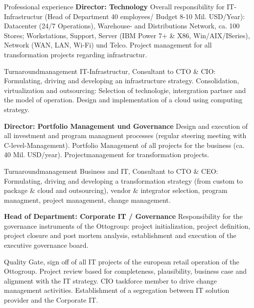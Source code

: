 \begin{rubric}{Professional experience}
\entry*[04/2013 - today] \textbf{Director: Technology}\newline
{} 
Overall responsibility for IT-Infrastructur (Head of Department 40 employees/ Budget 8-10 Mil. USD/Year): Datacenter (24/7 Operations), Warehouse- and Distributions Network, ca. 100 Stores; Workstations, Support, Server (IBM Power 7+ \& X86, Win/AIX/ISeries), Network (WAN, LAN, Wi-Fi) und Telco. Project management for all transformation projects regarding infrastructur.

Turnaroundmanagement IT-Infrastructur, Consultant to CTO \& CIO: Formulating, driving and developing an infrastructure strategy. Consolidation, virtualization and outsourcing: Selection of technologie, intergration partner and the model of operation. Design and implementation of a cloud using computing strategy.

\entry*[10/2011 - 03/2013] \textbf{Director: Portfolio Management und Governance}\newline
{} 
Design and execution of all investment and program managment processes (regular steering meeting with C-level-Management). Portfolio Management of all projects for the business (ca. 40 Mil. USD/year). Projectmanagement for transformation projects.\axelvspace

Turnaroundmanagement Business and IT, Consultant to CTO \& CEO: Formulating, driving and developing a transformation strategy (from custom to package \& cloud and outsourcing), vendor \& integrator selection, program managment, project management, change management.\newline

\pagebreak
{}
\entry*[08/2009 - 10/2011] \textbf{Head of Department: Corporate IT / Governance}\newline
{} 
Responsibility for the governance instruments of the Ottogroup: project initialization, project definition, project closure and post mortem analysis, establishment and execution of the executive governance board.\axelvspace

Quality Gate, sign off of all IT projects of the european retail operation of the Ottogroup. Project review based for completeness, plausibility, business case and alignment with the IT strategy. CIO taskforce member to drive change management activities. Establishment of a segregation between IT solution provider and the Corporate IT.


\end{rubric}

